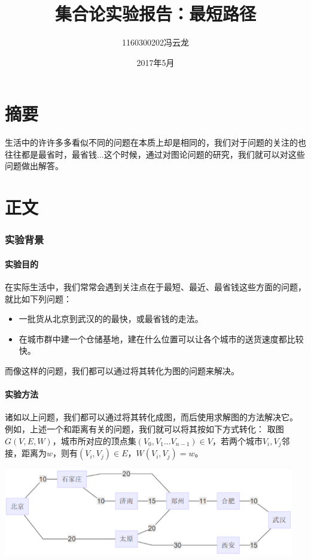 \documentclass[a4paper,10pt]{ctexart}
\title{集合论实验报告：最短路径}
\author{1160300202冯云龙}
\date{2017年5月}
\begin{document}
\maketitle

\part*{摘要}
生活中的许许多多看似不同的问题在本质上却是相同的，我们对于问题的关注的也往往都是最省时，最省钱...这个时候，通过对图论问题的研究，我们就可以对这些问题做出解答。

\tableofcontents
\part{正文}
\section{实验背景}

\subsection{实验目的}
在实际生活中，我们常常会遇到关注点在于最短、最近、最省钱这些方面的问题，就比如下列问题：
\begin{itemize}
\item 一批货从北京到武汉的的最快，或最省钱的走法。
\item 在城市群中建一个仓储基地，建在什么位置可以让各个城市的送货速度都比较快。
\end{itemize}
而像这样的问题，我们都可以通过将其转化为图的问题来解决。

\subsection{实验方法}
诸如以上问题，我们都可以通过将其转化成图，而后使用求解图的方法解决它。
例如，上述一个和距离有关的问题，我们就可以将其按如下方式转化：
取图$G(V,E,W)$，城市所对应的顶点集$(V_0,V_1...V_{n-1}) \in V $，若两个城市$V_i,V_j$邻接，距离为$w$，则有$(V_i,V_j)\in E$，$W(V_i,V_j)=w$。

\includegraphics[width = 5in]{MiniLen.eps}
\end{document}
